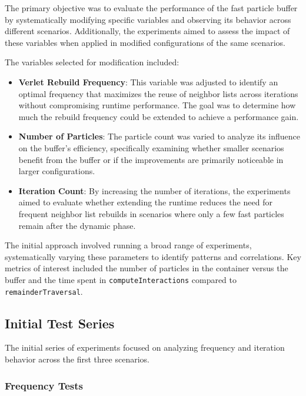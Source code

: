 The primary objective was to evaluate the performance of the fast particle buffer by systematically modifying specific variables and observing its behavior across different scenarios. Additionally, the experiments aimed to assess the impact of these variables when applied in modified configurations of the same scenarios.

The variables selected for modification included:
\begin{itemize}
    \item \textbf{Verlet Rebuild Frequency}: This variable was adjusted to identify an optimal frequency that maximizes the reuse of neighbor lists across iterations without compromising runtime performance. The goal was to determine how much the rebuild frequency could be extended to achieve a performance gain.
    \item \textbf{Number of Particles}: The particle count was varied to analyze its influence on the buffer's efficiency, specifically examining whether smaller scenarios benefit from the buffer or if the improvements are primarily noticeable in larger configurations.
    \item \textbf{Iteration Count}: By increasing the number of iterations, the experiments aimed to evaluate whether extending the runtime reduces the need for frequent neighbor list rebuilds in scenarios where only a few fast particles remain after the dynamic phase.
\end{itemize}

The initial approach involved running a broad range of experiments, systematically varying these parameters to identify patterns and correlations. Key metrics of interest included the number of particles in the container versus the buffer and the time spent in \texttt{computeInteractions} compared to \texttt{remainderTraversal}. 

\subsection{Initial Test Series}

The initial series of experiments focused on analyzing frequency and iteration behavior across the first three scenarios.

\subsubsection{Frequency Tests}

